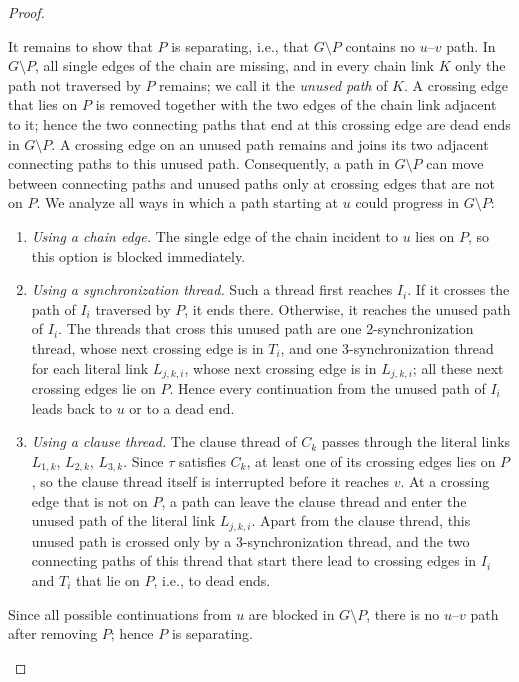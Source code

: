 \begin{proof}
\begin{enumerate}[label=(\alph*)]
It remains to show that $P$ is separating, i.e., that $G\setminus P$ contains no $u$--$v$ path.
In $G \setminus P$, all single edges of the chain are missing, and in every chain link $K$ only the path not traversed by $P$ remains; we call it the \emph{unused path} of $K$.
A crossing edge that lies on $P$ is removed together with the two edges of the chain link adjacent to it; hence the two connecting paths that end at this crossing edge are dead ends in $G \setminus P$.
A crossing edge on an unused path remains and joins its two adjacent connecting paths to this unused path.
Consequently, a path in $G \setminus P$ can move between connecting paths and unused paths only at crossing edges that are not on $P$.
We analyze all ways in which a path starting at $u$ could progress in $G \setminus P$:
\begin{enumerate}
  \item \emph{Using a chain edge.} The single edge of the chain incident to $u$ lies on $P$, so this option is blocked immediately.
  \item \emph{Using a synchronization thread.} Such a thread first reaches $I_i$.
  If it crosses the path of $I_i$ traversed by $P$, it ends there.
  Otherwise, it reaches the unused path of $I_i$.
  The threads that cross this unused path are one 2-synchronization thread, whose next crossing edge is in $T_i$, and one 3-synchronization thread for each literal link $L_{j,k,i}$, whose next crossing edge is in $L_{j,k,i}$; all these next crossing edges lie on $P$.
  Hence every continuation from the unused path of $I_i$ leads back to $u$ or to a dead end.
  \item \emph{Using a clause thread.} The clause thread of $C_k$ passes through the literal links $L_{1,k}$, $L_{2,k}$, $L_{3,k}$.
  Since $\tau$ satisfies $C_k$, at least one of its crossing edges lies on $P$, so the clause thread itself is interrupted before it reaches $v$.
  At a crossing edge that is not on $P$, a path can leave the clause thread and enter the unused path of the literal link $L_{j,k,i}$.
  Apart from the clause thread, this unused path is crossed only by a 3-synchronization thread, and the two connecting paths of this thread that start there lead to crossing edges in $I_i$ and $T_i$ that lie on $P$, i.e., to dead ends.
\end{enumerate}
Since all possible continuations from $u$ are blocked in $G\setminus P$, there is no $u$--$v$ path after removing $P$; hence $P$ is separating.
\end{enumerate}


\end{proof}
